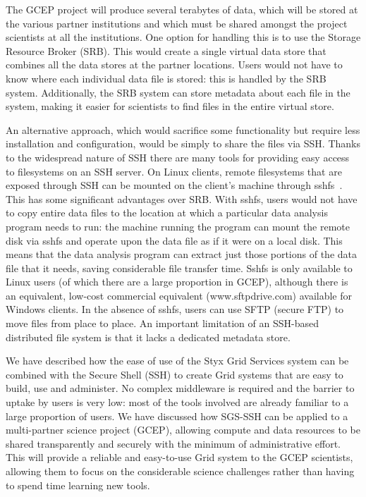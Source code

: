 \documentclass[times,10pt,twocolumn]{article}
\begin{document}
\label{sec:datamanagement}
The GCEP project will produce several terabytes of data, which will be stored at the various partner institutions and which must be shared amongst the project scientists at all the institutions.  One option for handling this is to use the Storage Resource Broker (SRB).  This would create a single virtual data store that combines all the data stores at the partner locations.  Users would not have to know where each individual data file is stored: this is handled by the SRB system.  Additionally, the SRB system can store metadata about each file in the system, making it easier for scientists to find files in the entire virtual store.

An alternative approach, which would sacrifice some functionality but require less installation and configuration, would be simply to share the files via SSH.  Thanks to the widespread nature of SSH there are many tools for providing easy access to filesystems on an SSH server.  On Linux clients, remote filesystems that are exposed through SSH can be mounted on the client's machine through sshfs~\cite{sshfs}.  This has some significant advantages over SRB.  With sshfs, users would not have to copy entire data files to the location at which a particular data analysis program needs to run: the machine running the program can mount the remote disk via sshfs and operate upon the data file as if it were on a local disk.  This means that the data analysis program can extract just those portions of the data file that it needs, saving considerable file transfer time.  Sshfs is only available to Linux users (of which there are a large proportion in GCEP), although there is an equivalent, low-cost commercial equivalent (www.sftpdrive.com) available for Windows clients.  In the absence of sshfs, users can use SFTP (secure FTP) to move files from place to place.  An important limitation of an SSH-based distributed file system is that it lacks a dedicated metadata store.

We have described how the ease of use of the Styx Grid Services system can be combined with the Secure Shell (SSH) to create Grid systems that are easy to build, use and administer.  No complex middleware is required and the barrier to uptake by users is very low: most of the tools involved are already familiar to a large proportion of users.  We have discussed how SGS-SSH can be applied to a multi-partner science project (GCEP), allowing compute and data resources to be shared transparently and securely with the minimum of administrative effort.  This will provide a reliable and easy-to-use Grid system to the GCEP scientists, allowing them to focus on the considerable science challenges rather than having to spend time learning new tools.
\end{document}
